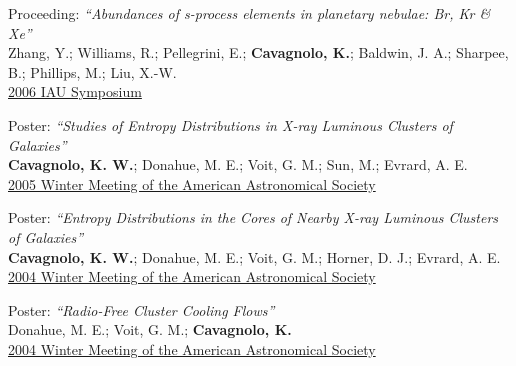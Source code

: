 \documentclass[11pt]{cv}
\begin{document}
\begin{llist}
{\sc Proceeding: {\textit{``Abundances of s-process elements in planetary nebulae: Br, Kr \& Xe''}}}\\
Zhang, Y.; Williams, R.; Pellegrini, E.; {\bf Cavagnolo, K.}; Baldwin,
J. A.; Sharpee, B.; Phillips, M.; Liu, X.-W.\\
\href{http://adsabs.harvard.edu/abs/2006IAUS..234..549Z}{2006 IAU
Symposium}

{\sc Poster: {\textit{``Studies of Entropy Distributions in X-ray Luminous Clusters of Galaxies''}}}\\
{\bf Cavagnolo, K. W.}; Donahue, M. E.; Voit, G. M.; Sun, M.; Evrard, A. E.\\
\href{http://adsabs.harvard.edu/abs/2005AAS...20713903C}{2005 Winter
Meeting of the American Astronomical Society}

{\sc Poster: {\textit{``Entropy Distributions in the Cores of Nearby X-ray Luminous Clusters of Galaxies''}}}\\
{\bf Cavagnolo, K. W.}; Donahue, M. E.; Voit, G. M.; Horner, D. J.; Evrard, A. E.\\
\href{http://adsabs.harvard.edu/abs/2004AAS...20514715C}{2004 Winter
Meeting of the American Astronomical Society}

{\sc Poster: {\textit{``Radio-Free Cluster Cooling Flows''}}}\\
Donahue, M. E.; Voit, G. M.; {\bf Cavagnolo, K.}\\
\href{http://adsabs.harvard.edu/abs/2004AAS...205.6020D}{2004 Winter
Meeting of the American Astronomical Society}



\end{llist}
\end{document}
